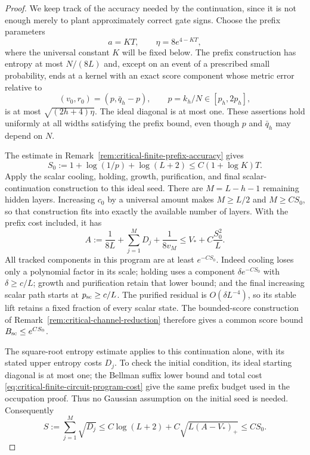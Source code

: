 \begin{proof}
We keep track of the accuracy needed by the continuation, since it is
not enough merely to plant approximately correct gate signs.  Choose
the prefix parameters
\[
 a=KT,\qquad \eta=8e^{4-KT},
\]
where the universal constant $K$ will be fixed below.  The prefix
construction has entropy at most $N/(8L)$ and, except on an event
of a prescribed small probability, ends at a kernel with an exact
score component whose metric error relative to
\[
 (v_0,r_0)=(p,\bar q_h-p),\qquad p=k_h/N\in[p_h,2p_h],
\]
is at most $\sqrt{(2h+4)\eta}$.  The ideal diagonal is at most
one.  These assertions hold uniformly at all widths satisfying the
prefix bound, even though $p$ and $\bar q_h$ may depend on $N$.

The estimate in Remark~\ref{rem:critical-finite-prefix-accuracy} gives
\begin{equation}\label{eq:critical-finite-circuit-seed-log}
 S_0:=1+\log(1/p)+\log(L+2)
       \le C(1+\log K)T.
\end{equation}
Apply the scalar cooling, holding, growth, purification, and final
scalar-continuation construction to this ideal seed.  There are
$M=L-h-1$ remaining hidden layers.  Increasing $c_0$ by a universal
amount makes $M\ge L/2$ and $M\ge C S_0$, so that construction
fits into exactly the available number of layers.  With the prefix
cost included, it has
\begin{equation}\label{eq:critical-finite-circuit-program-cost}
 A:=\frac1{8L}+\sum_{j=1}^M D_j+\frac1{8v_M}
       \le V_*+C\frac{S_0^2}{L}.
\end{equation}
All tracked components in this program are at least $e^{-CS_0}$.
Indeed cooling loses only a polynomial factor in its scale; holding
uses a component $\delta e^{-CS_0}$ with $\delta\ge c/L$;
growth and purification retain that lower bound; and the final
increasing scalar path starts at $p_{\rm sc}\ge c/L$.  The
purified residual is $O(\delta L^{-4})$, so its stable lift retains
a fixed fraction of every scalar state.  The bounded-score
construction of Remark~\ref{rem:critical-channel-reduction} therefore
gives a common score bound $B_{\rm sc}\le e^{CS_0}$.

The square-root entropy estimate applies to this continuation alone,
with its stated upper entropy costs $D_j$.  To check the initial
condition, its ideal starting diagonal is at most one; the Bellman
suffix lower bound and total cost
\eqref{eq:critical-finite-circuit-program-cost} give the same prefix
budget used in the occupation proof.  Thus no Gaussian assumption
on the initial seed is needed.  Consequently
\begin{equation}\label{eq:critical-finite-circuit-score-budget}
 S:=\sum_{j=1}^M\sqrt{D_j}
 \le C\log(L+2)+C\sqrt{L(A-V_*)_+}
 \le C S_0.
\end{equation}


\end{proof}
